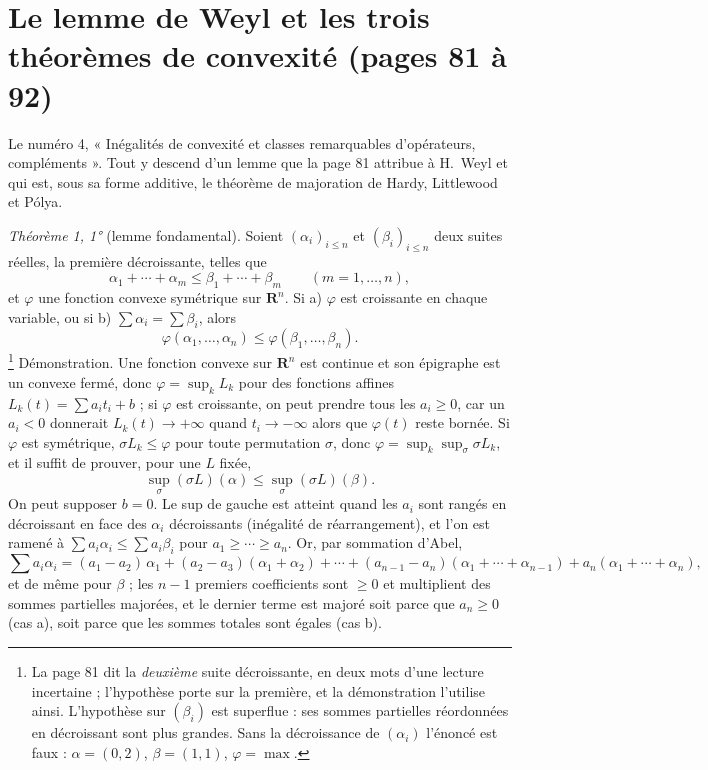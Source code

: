 \documentclass[11pt,a4paper]{article}
\begin{document}
\section*{Le lemme de Weyl et les trois théorèmes de convexité (pages 81 à 92)}

Le numéro 4, « Inégalités de convexité et classes remarquables d'opérateurs,
compléments ». Tout y descend d'un lemme que la page 81 attribue à H.\ Weyl
et qui est, sous sa forme additive, le théorème de majoration de Hardy,
Littlewood et Pólya.

\emph{Théorème 1, 1°} (lemme fondamental). Soient $(\alpha_i)_{i \leq n}$ et
$(\beta_i)_{i \leq n}$ deux suites réelles, la première décroissante, telles
que
\[
  \alpha_1 + \cdots + \alpha_m \leq \beta_1 + \cdots + \beta_m \qquad
  (m = 1, \ldots, n),
\]
et $\varphi$ une fonction convexe symétrique sur $\mathbf{R}^n$. Si a)
$\varphi$ est croissante en chaque variable, ou si b) $\sum \alpha_i = \sum
\beta_i$, alors
\[
  \varphi(\alpha_1, \ldots, \alpha_n) \leq \varphi(\beta_1, \ldots, \beta_n) .
\]
\footnote{La page 81 dit la \emph{deuxième} suite décroissante, en deux mots
d'une lecture incertaine ; l'hypothèse porte sur la première, et la
démonstration l'utilise ainsi. L'hypothèse sur $(\beta_i)$ est superflue :
ses sommes partielles réordonnées en décroissant sont plus grandes. Sans
la décroissance de $(\alpha_i)$ l'énoncé est faux : $\alpha = (0, 2)$,
$\beta = (1, 1)$, $\varphi = \max$.}
Démonstration. Une fonction convexe sur $\mathbf{R}^n$ est continue et son
épigraphe est un convexe fermé, donc $\varphi = \sup_k L_k$ pour des
fonctions affines $L_k(t) = \sum a_i t_i + b$ ; si $\varphi$ est croissante,
on peut prendre tous les $a_i \geq 0$, car un $a_i < 0$ donnerait $L_k(t) \to
+\infty$ quand $t_i \to -\infty$ alors que $\varphi(t)$ reste bornée. Si
$\varphi$ est symétrique, $\sigma L_k \leq \varphi$ pour toute permutation
$\sigma$, donc $\varphi = \sup_k \sup_\sigma \sigma L_k$, et il suffit de
prouver, pour une $L$ fixée,
\[
  \sup_\sigma (\sigma L)(\alpha) \leq \sup_\sigma (\sigma L)(\beta) .
\]
On peut supposer $b = 0$. Le sup de gauche est atteint quand les $a_i$ sont
rangés en décroissant en face des $\alpha_i$ décroissants (inégalité de
réarrangement), et l'on est ramené à $\sum a_i\alpha_i \leq \sum a_i\beta_i$
pour $a_1 \geq \cdots \geq a_n$. Or, par sommation d'Abel,
\[
  \sum a_i\alpha_i = (a_1 - a_2)\,\alpha_1 + (a_2 - a_3)(\alpha_1 + \alpha_2)
  + \cdots + (a_{n-1} - a_n)(\alpha_1 + \cdots + \alpha_{n-1})
  + a_n(\alpha_1 + \cdots + \alpha_n),
\]
et de même pour $\beta$ ; les $n-1$ premiers coefficients sont $\geq 0$ et
multiplient des sommes partielles majorées, et le dernier terme est majoré
soit parce que $a_n \geq 0$ (cas a), soit parce que les sommes totales sont
égales (cas b).
\end{document}
